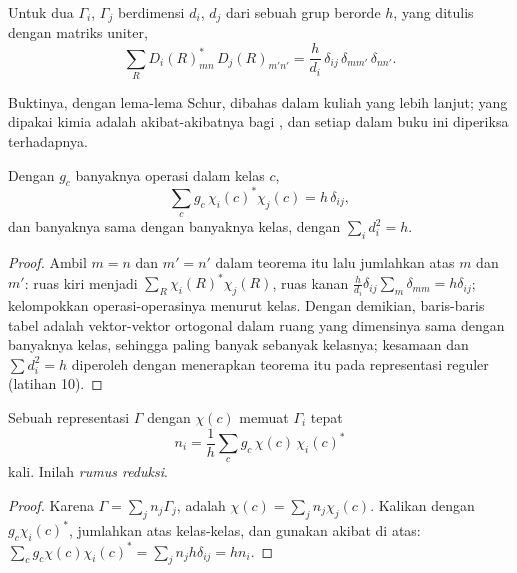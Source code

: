 \begin{theorem}\label{thm:b3:group-theory-applied:great-orthogonality}
Untuk dua  $\Gamma_i$, $\Gamma_j$ berdimensi $d_i$,
$d_j$ dari sebuah grup berorde $h$, yang ditulis dengan matriks uniter,
\[
\sum_R D_i(R)_{mn}^*\,D_j(R)_{m'n'} = \frac{h}{d_i}\,\delta_{ij}\,\delta_{mm'}\,\delta_{nn'}.
\]
\end{theorem}
\admitted

Buktinya, dengan lema-lema Schur, dibahas dalam kuliah yang lebih lanjut;
yang dipakai kimia adalah akibat-akibatnya bagi , dan setiap  dalam buku ini diperiksa terhadapnya.

\begin{corollary}\label{cor:b3:group-theory-applied:characters}
Dengan $g_c$ banyaknya operasi dalam kelas $c$,
\[
\sum_cg_c\,\chi_i(c)^*\chi_j(c) = h\,\delta_{ij},
\]
dan banyaknya  sama dengan banyaknya kelas, dengan
$\sum_id_i^2 = h$.
\end{corollary}

\begin{proof}
Ambil $m = n$ dan $m' = n'$ dalam teorema itu lalu jumlahkan atas $m$ dan
$m'$: ruas kiri menjadi $\sum_R\chi_i(R)^*\chi_j(R)$, ruas kanan $\frac{h}{d_i}\delta_{ij}
\sum_{m}\delta_{mm} = h\delta_{ij}$; kelompokkan operasi-operasinya menurut kelas.
Dengan demikian, baris-baris tabel adalah vektor-vektor ortogonal dalam ruang
yang dimensinya sama dengan banyaknya kelas, sehingga  paling banyak sebanyak kelasnya; kesamaan dan $\sum d_i^2 = h$
diperoleh dengan menerapkan teorema itu pada representasi reguler
(latihan 10).
\end{proof}

\begin{theorem}\label{thm:b3:group-theory-applied:reduction}
Sebuah representasi $\Gamma$ dengan  $\chi(c)$ memuat  $\Gamma_i$ tepat
\[
n_i = \frac1h\sum_cg_c\,\chi(c)\,\chi_i(c)^*
\]
kali. Inilah \emph{rumus reduksi}.
\end{theorem}

\begin{proof}
Karena $\Gamma = \sum_jn_j\Gamma_j$,  adalah $\chi(c) = \sum_jn_j\chi_j(c)$.
Kalikan dengan $g_c\chi_i(c)^*$, jumlahkan atas kelas-kelas, dan gunakan
akibat di atas: $\sum_cg_c\chi(c)\chi_i(c)^* = \sum_jn_jh\delta_{ij} = hn_i$.
\end{proof}

